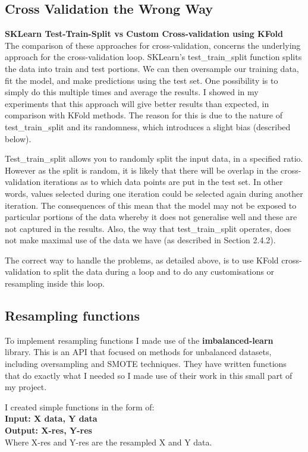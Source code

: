 \documentclass[12pt,a4paper,twoside]{report}
\begin{document}
\subsection{Cross Validation the Wrong Way}

\textbf{SKLearn Test-Train-Split vs Custom Cross-validation using KFold}\\
The comparison of these approaches for cross-validation, concerns the underlying approach for the cross-validation loop. SKLearn's test\_train\_split function splits the data into train and test portions. We can then oversample our training data, fit the model, and make predictions using the test set.
One possibility is to simply do this multiple times and average the results.
I showed in my experiments that this approach will give better results than expected, in comparison with KFold methods. The reason for this is due to the nature of test\_train\_split and its randomness, which introduces a slight bias (described below).

Test\_train\_split allows you to randomly split the input data, in a specified ratio. However as the split is random, it is likely that there will be overlap in the cross-validation iterations as to which data points are put in the test set. In other words, values selected during one iteration could be selected again during another iteration.
The consequences of this mean that the model may not be exposed to particular portions of the data whereby it does not generalise well and these are not captured in the results. Also, the way that test\_train\_split operates, does not make maximal use of the data we have (as described in Section 2.4.2).

The correct way to handle the problems, as detailed above, is to use KFold cross-validation to split the data during a loop and to do any customisations or resampling inside this loop.

\subsection{Resampling functions}
To implement resampling functions I made use of the \textbf{imbalanced-learn}~\cite{JMLR:v18:16-365} library. This is an API that focused on methods for unbalanced datasets, including oversampling and SMOTE techniques. They have written functions that do exactly what I needed so I made use of their work in this small part of my project. 

I created simple functions in the form of:\\
\textbf{Input: X data, Y data}\\
\textbf{Output: X-res, Y-res}\\
Where X-res and Y-res are the resampled X and Y data. \\
\end{document}
